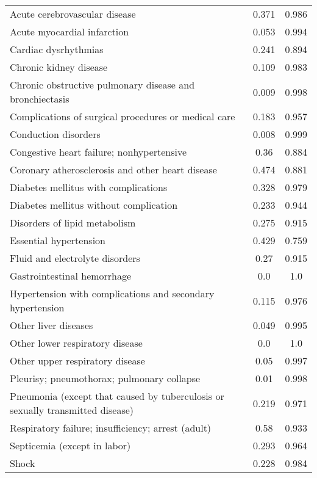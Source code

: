 \documentclass{article}
\begin{document}
\begin{longtable}{lcc}
Acute cerebrovascular disease & 0.371 & 0.986 \\
Acute myocardial infarction & 0.053 & 0.994 \\
Cardiac dysrhythmias & 0.241 & 0.894 \\
Chronic kidney disease & 0.109 & 0.983 \\
Chronic obstructive pulmonary disease and bronchiectasis & 0.009 & 0.998 \\
Complications of surgical procedures or medical care & 0.183 & 0.957 \\
Conduction disorders & 0.008 & 0.999 \\
Congestive heart failure; nonhypertensive & 0.36 & 0.884 \\
Coronary atherosclerosis and other heart disease & 0.474 & 0.881 \\
Diabetes mellitus with complications & 0.328 & 0.979 \\
Diabetes mellitus without complication & 0.233 & 0.944 \\
Disorders of lipid metabolism & 0.275 & 0.915 \\
Essential hypertension & 0.429 & 0.759 \\
Fluid and electrolyte disorders & 0.27 & 0.915 \\
Gastrointestinal hemorrhage & 0.0 & 1.0 \\
Hypertension with complications and secondary hypertension & 0.115 & 0.976 \\
Other liver diseases & 0.049 & 0.995 \\
Other lower respiratory disease & 0.0 & 1.0 \\
Other upper respiratory disease & 0.05 & 0.997 \\
Pleurisy; pneumothorax; pulmonary collapse & 0.01 & 0.998 \\
Pneumonia (except that caused by tuberculosis or sexually transmitted disease) & 0.219 & 0.971 \\
Respiratory failure; insufficiency; arrest (adult) & 0.58 & 0.933 \\
Septicemia (except in labor) & 0.293 & 0.964 \\
Shock & 0.228 & 0.984 \\
\bottomrule
\end{longtable}
\end{document}
